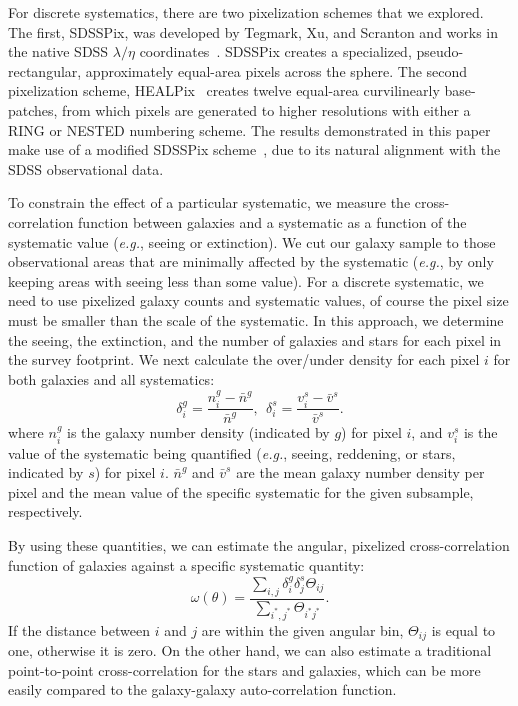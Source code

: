 For discrete systematics, there are two pixelization schemes that we explored. The first, SDSSPix, was developed by Tegmark, Xu, and Scranton and works in the native SDSS $\lambda/\eta$ coordinates~\citep{Stoughton02}. SDSSPix creates a specialized, pseudo-rectangular, approximately equal-area pixels across the sphere. The second pixelization scheme, HEALPix~\citep{Gorski05} creates twelve equal-area curvilinearly base-patches, from which pixels are generated to higher resolutions with either a RING or NESTED numbering scheme. The results demonstrated in this paper make use of a modified SDSSPix scheme~\citep{Ross06}, due to its natural alignment with the SDSS observational data.

To constrain the effect of a particular systematic, we measure the cross-correlation function between galaxies and a systematic as a function of the systematic value (\textit{e.g.}, seeing or extinction). We cut our galaxy sample to those observational areas that are minimally affected by the systematic (\textit{e.g.}, by only keeping areas with seeing less than some value). For a discrete systematic, we need to use pixelized galaxy counts and systematic values, of course the pixel size must be smaller than the scale of the systematic. In this approach, we determine the seeing, the extinction, and the number of galaxies and stars for each pixel in the survey footprint. We next calculate the over/under density for each pixel $i$ for both galaxies and all systematics:
\begin{equation}
\delta^g_i = \frac{n^g_i-\bar{n}^g}{\bar{n}^g},\ \ \delta^s_i = \frac{v^s_i-\bar{v}^s}{\bar{v}^s}.
\end{equation}
where $n^g_i$ is the galaxy number density (indicated by $g$) for pixel $i$, and $v^s_i$ is the value of the systematic being quantified (\textit{e.g.}, seeing, reddening, or stars, indicated by $s$) for pixel $i$. $\bar{n}^g$ and $\bar{v}^s$ are the mean galaxy number density per pixel and the mean value of the specific systematic for the given subsample, respectively.

By using these quantities, we can estimate the angular, pixelized cross-correlation function of galaxies against a specific systematic quantity:
\begin{equation}
\omega(\theta)=\frac{\sum_{i,j} \delta^g_i\delta^s_j\Theta_{ij}}{\sum_{i^*,j^*} \Theta_{i^*j^*}}.
\end{equation}
If the distance between $i$ and $j$ are within the given angular bin, $\Theta_{ij}$ is equal to one, otherwise it is zero. On the other hand, we can also estimate a traditional point-to-point cross-correlation for the stars and galaxies, which can be more easily compared to the galaxy-galaxy auto-correlation function.

